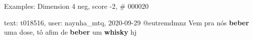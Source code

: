 \begin{frame}{Examples: Dimension 4 neg, score -2, \# 000020}
\footnotesize
\begin{alertblock}{text: t018516, user: naynha\_mtq, 2020-09-29}
@eutremdmnz Vem pra nós \textbf{beber} uma dose, tô afim de \textbf{beber} um 
\textbf{whisky} hj   
\end{alertblock}
\end{frame}
